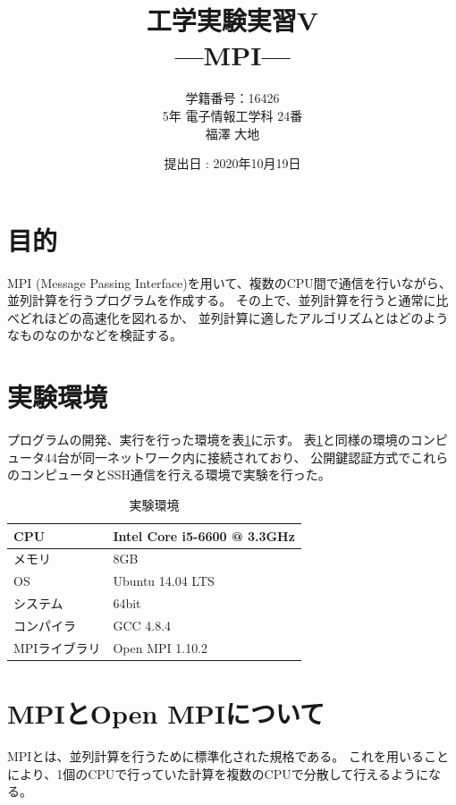\documentclass[a4j,titlepage]{jsarticle}
\begin{document}
\begin{titlepage}
  \title{\huge{工学実験実習V} \\ \LARGE{---MPI---}}
	\author{学籍番号：16426 \\ 5年 電子情報工学科 24番 \\ 福澤 大地}
	\date{提出日 : 2020年10月19日}
  \maketitle
\end{titlepage}


\section{目的}
MPI (Message Passing Interface)を用いて、複数のCPU間で通信を行いながら、
並列計算を行うプログラムを作成する。
その上で、並列計算を行うと通常に比べどれほどの高速化を図れるか、
並列計算に適したアルゴリズムとはどのようなものなのかなどを検証する。


\section{実験環境}
プログラムの開発、実行を行った環境を表\ref{tb:kan}に示す。
表\ref{tb:kan}と同様の環境のコンピュータ44台が同一ネットワーク内に接続されており、
公開鍵認証方式でこれらのコンピュータとSSH通信を行える環境で実験を行った。

\begin{table}[H]
  \centering
  \caption{実験環境}
  \label{tb:kan}

  \begin{tabular}{|l|l|}
    \hline
    CPU & Intel Core i5-6600 @ 3.3GHz \\ \hline
    メモリ & 8GB \\ \hline
    OS & Ubuntu 14.04 LTS \\ \hline
    システム & 64bit \\ \hline
    コンパイラ & GCC 4.8.4 \\ \hline
    MPIライブラリ & Open MPI 1.10.2 \\ \hline
  \end{tabular}
\end{table}


\section{MPIとOpen MPIについて}
MPIとは、並列計算を行うために標準化された規格である。
これを用いることにより、1個のCPUで行っていた計算を複数のCPUで分散して行えるようになる。
\end{document}
